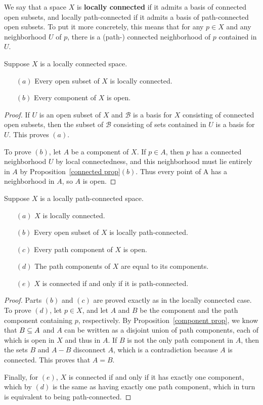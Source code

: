 We say that a space $X$ is \textbf{locally connected} if it admits a basis of connected open subsets, and locally path-connected if it admits a basis of path-connected open subsets. To put it more concretely, this means that for any $p\in X$ and any neighborhood $U$ of $p$, there is a (path-) connected neighborhood of $p$ contained in $U$.
\begin{proposition}
Suppose $X$ is a locally connected space.
\begin{itemize}
\item[$(a)$]Every open subset of $X$ is locally connected.
\item[$(b)$]Every component of $X$ is open.
\end{itemize}
\end{proposition}
\begin{proof}
If $U$ is an open subset of $X$ and $\mathcal{B}$ is a basis for $X$ consisting of connected open subsets, then the subset of $\mathcal{B}$ consisting of sets contained in $U$ is a basis for $U$. This proves $(a)$.\par
To prove $(b)$, let $A$ be a component of $X$. If $p\in A$, then $p$ has a connected
neighborhood $U$ by local connectedness, and this neighborhood must lie entirely in
$A$ by Proposition~\ref{connected prop}$(b)$. Thus every point of A has a neighborhood in $A$, so $A$ is open.
\end{proof}
\begin{proposition}
Suppose $X$ is a locally path-connected space.
\begin{itemize}
\item[$(a)$]$X$ is locally connected.
\item[$(b)$]Every open subset of $X$ is locally path-connected.
\item[$(c)$]Every path component of $X$ is open.
\item[$(d)$]The path components of $X$ are equal to its components.
\item[$(e)$]$X$ is connected if and only if it is path-connected.
\end{itemize}
\end{proposition}
\begin{proof}
Parts $(b)$ and $(c)$ are proved exactly as in the locally connected case. To prove $(d)$, let $p\in X$, and let $A$ and $B$ be the component and the path component containing $p$, respectively. By Proposition~\ref{component prop}, we know that $B\subseteq A$ and $A$ can be written as a disjoint union of path components, each of which is open in $X$ and thus in $A$. If $B$ is not the only path component in $A$, then the sets $B$ and $A-B$ disconnect $A$, which is a contradiction because $A$ is connected. This proves that $A=B$.\par 
Finally, for $(e)$, $X$ is connected if and only if it has exactly one component, which by $(d)$ is the same as having exactly one path component, which in turn is equivalent to being path-connected.
\end{proof}
\vspace{5mm}
